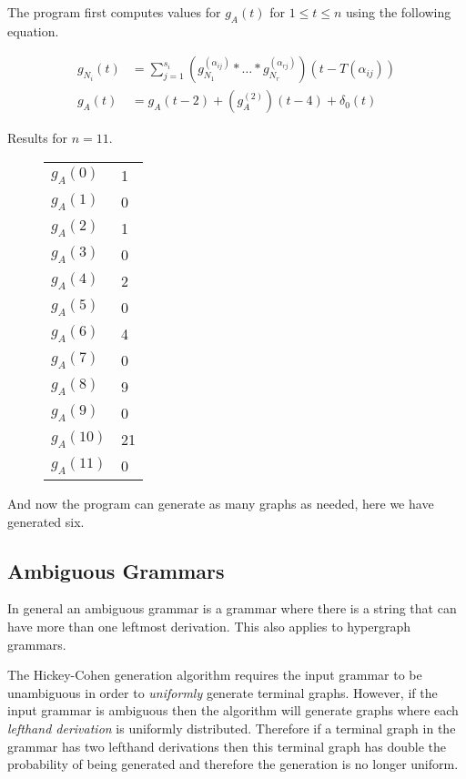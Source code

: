 



The program first computes values for $g_A(t)$ for $1 \leq t \leq n$ using the following equation.

\begin{align*}
  g_{N_i}(t) &= \sum_{j=1}^{s_i} \left(g_{N_1}^{(\alpha_{ij})} * \hdots * g_{N_r}^{(\alpha_{rj})}\right)(t - T(\alpha_{ij})) \\
  g_A(t) &= g_A(t-2) + (g_A^{(2)})(t-4) + \delta_0(t)
\end{align*}

Results for $n=11$.

\begin{figure}[!h]
\centering
\begin{tabular}{l|l}
$g_A(0)$ & 1 \\
$g_A(1)$ & 0 \\
$g_A(2)$ & 1 \\
$g_A(3)$ & 0 \\
$g_A(4)$ & 2 \\
$g_A(5)$ & 0 \\
$g_A(6)$ & 4 \\
$g_A(7)$ & 0 \\
$g_A(8)$ & 9 \\
$g_A(9)$ & 0 \\
$g_A(10)$ & 21 \\
$g_A(11)$ & 0 \\
\end{tabular}
\end{figure}

And now the program can generate as many graphs as needed, here we have generated six.



\subsection{Ambiguous Grammars}

In general an ambiguous grammar is a grammar where there is a string that can have more than one  leftmost derivation. This also applies to hypergraph grammars.

The Hickey-Cohen generation algorithm requires the input grammar to be unambiguous in order to \emph{uniformly} generate terminal graphs. However, if the input grammar is ambiguous then the algorithm will generate graphs where each \emph{lefthand derivation} is uniformly distributed. Therefore if a terminal graph in the grammar has two lefthand derivations then this terminal graph has double the probability of being generated and therefore the generation is no longer uniform.

